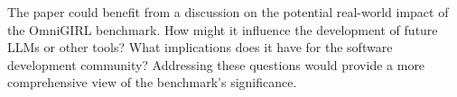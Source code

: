 \documentclass[12pt,american]{article}
\begin{document}
\begin{revresponse}
\end{revresponse}

\newpage
\begin{revcomment}\label{reviewer:3.3}

The paper could benefit from a discussion on the potential real-world impact of the OmniGIRL benchmark. How might it influence the development of future LLMs or other tools? What implications does it have for the software development community? Addressing these questions would provide a more comprehensive view of the benchmark's significance.







\end{revcomment}
\end{document}

